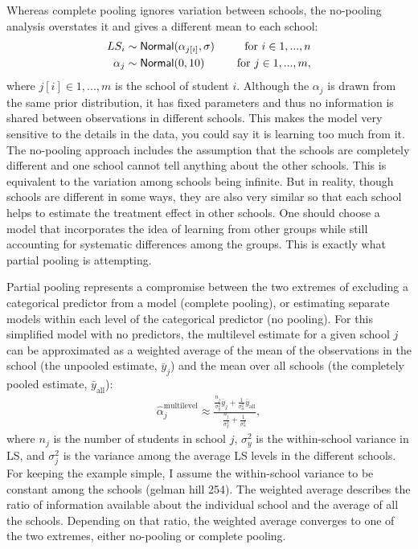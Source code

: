 \documentclass[a4, 12pt]{article}
\begin{document}
Whereas complete pooling ignores variation between schools, the no-pooling analysis overstates it and gives a different mean to each school:
\begin{align*}
LS_i & \sim {\sf Normal} (\alpha_{j[i]}, \sigma) & \quad \text{for } i \in 1,...,n \\
\alpha_{j} & \sim {\sf Normal} (0, 10) & \quad \text{for } j \in 1,...,m,
\end{align*}
where \(j[i] \in 1,...,m\) is the school of student \(i\).
Although the \(\alpha_j\) is drawn from the same prior distribution, it has fixed parameters and thus no information is shared between observations in different schools. This makes the model very sensitive to the details in the data, you could say it is learning too much from it. The no-pooling approach includes the assumption that the schools are completely different and one school cannot tell anything about the other schools. This is equivalent to the variation among schools being infinite. But in reality, though schools are different in some ways, they are also very similar so that each school helps to estimate the treatment effect in other schools. One should choose a model that incorporates the idea of learning from other groups while still accounting for systematic differences among the groups. This is exactly what partial pooling is attempting.

Partial pooling represents a compromise between the two extremes of excluding a categorical predictor from a model (complete pooling), or estimating separate models within each level of the categorical predictor (no pooling). For this simplified model with no predictors, the multilevel estimate for a given school \(j\) can be approximated as a weighted average of the mean of the observations in the school (the unpooled estimate, \(\bar{y}_j\)) and the mean over all schools (the completely pooled estimate, \(\bar{y}_{\mathrm {all}}\)):
\begin{align}\label{eq:weighted_average}
\hat{\alpha}_j^{\mathrm {multilevel}} \approx \frac {\frac{n_j}{\sigma_y^2}\bar y_j + \frac {1}{\sigma_{\alpha}^2}\bar y_{\mathrm {all}}}{\frac {n_j}{\sigma_y^2} + \frac {1}{\sigma_{\alpha}^2}},
\end{align}
where \(n_j\) is the number of students in school \(j\), \(\sigma^2_y\) is the within-school variance in LS, and \(\sigma^2_j\) is the variance among the average LS levels in the different schools. For keeping the example simple, I assume the within-school variance to be constant among the schools (gelman hill 254).
The weighted average describes the ratio of information available about the individual school and the average of all the schools. Depending on that ratio, the weighted average converges to one of the two extremes, either no-pooling or complete pooling.
\end{document}
